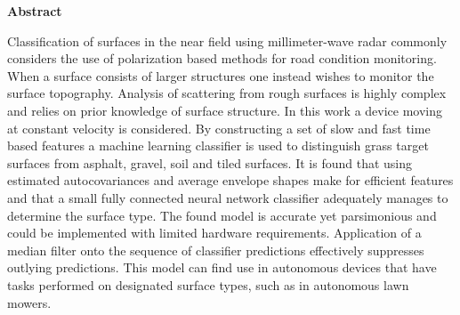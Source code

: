 \newenvironment{abstract}%
    {\cleardoublepage\thispagestyle{empty}\null\vfill\begin{center}%
    \bfseries{\textsf{Abstract}}\end{center}}%
    {\vfill\null}
\begin{abstract}
Classification of surfaces in the near field using millimeter-wave radar commonly considers the use of polarization based methods for road condition monitoring. When a surface consists of larger structures one instead wishes to monitor the surface topography. Analysis of scattering from rough surfaces is highly complex and relies on prior knowledge of surface structure. In this work a device moving at constant velocity is considered. By constructing a set of slow and fast time based features a machine learning classifier is used to distinguish grass target surfaces from asphalt, gravel, soil and tiled surfaces. It is found that using estimated autocovariances and average envelope shapes make for efficient features and that a small fully connected neural network classifier adequately manages to determine the surface type. The found model is accurate yet parsimonious and could be implemented with limited hardware requirements. Application of a median filter onto the sequence of classifier predictions effectively suppresses outlying predictions. This model can find use in autonomous devices that have tasks performed on designated surface types, such as in autonomous lawn mowers. 
	


\end{abstract}
